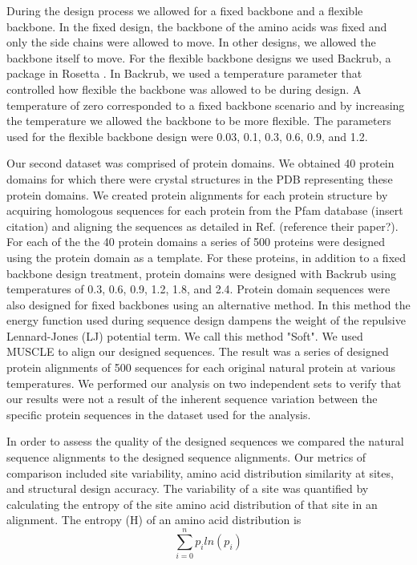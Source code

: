 \documentclass[12pt]{article}
\begin{document}
\par During the design process we allowed for a fixed backbone and a flexible backbone. In the fixed design, the backbone of the amino acids was fixed and only the side chains were allowed to move. In other designs, we allowed the backbone itself to move. For the flexible backbone designs we used Backrub, a package in Rosetta \cite{Smith2008}. In Backrub, we used a temperature parameter that controlled how flexible the backbone was allowed to be during design. A temperature of zero corresponded to a fixed backbone scenario and by increasing the temperature we allowed the backbone to be more flexible. The parameters used for the flexible backbone design were 0.03, 0.1, 0.3, 0.6, 0.9, and 1.2. 
\par Our second dataset was comprised of protein domains. We obtained 40 protein domains for which there were crystal structures in the PDB representing these protein domains.  We created protein alignments for each protein structure by acquiring homologous sequences for each protein from the Pfam database (insert citation) and aligning the sequences as detailed in Ref. (reference their paper?).   For each of the the 40 protein domains a series of 500 proteins  were designed using the protein domain as a template. For these proteins, in addition to a fixed backbone design treatment, protein domains were designed with Backrub using temperatures of 0.3, 0.6, 0.9, 1.2, 1.8, and 2.4. Protein domain sequences were also designed for fixed backbones using an alternative method. In this method the energy function used during sequence design dampens the weight of the repulsive Lennard-Jones (LJ) potential term. We call this method "Soft".  We used MUSCLE \cite{Edgar2004} to align our designed sequences. The result was a series of designed protein alignments of 500 sequences for each original natural protein at various temperatures.  We performed our analysis on two independent sets to verify that our results were not a result of the inherent sequence variation between the specific protein sequences in the dataset used for the analysis. 
\par In order to assess the quality of the designed sequences we compared the natural sequence alignments to the designed sequence alignments. Our metrics of comparison included site variability, amino acid distribution similarity at sites, and structural design accuracy. The variability of a site was quantified by calculating the entropy of the site amino acid distribution of that site in an alignment. 
The entropy (H) of an amino acid distribution is	$$ \sum_{i=0}^{n}p_iln{\left(p_i \right)} $$
\end{document}
